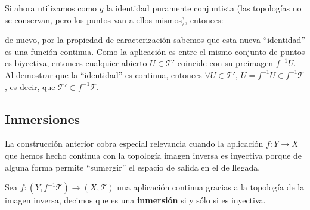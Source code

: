 \begin{demo}
\begin{itemize}
   Si ahora utilizamos como $g$ la identidad puramente conjuntista (las topologías no se conservan, pero los puntos van a ellos mismos), entonces:
    \begin{figure}[H]
        \centering    
    \end{figure}
    de nuevo, por la propiedad de caracterización sabemos que esta nueva ``identidad'' es una función continua. Como la aplicación es entre el mismo conjunto de puntos es biyectiva, entonces cualquier abierto $U\in \mathcal{T}'$ coincide con su preimagen $f^{-1}U$. Al demostrar que la ``identidad'' es continua, entonces $\forall U \in \mathcal{T}', \ U = f^{-1}U\in f^{-1}\mathcal{T}$, es decir, que $\mathcal{T}'\subset f^{-1}\mathcal{T}$.
\end{itemize}
\end{demo}

\subsection{Inmersiones}
\label{sub:inmersiones}
La construcción anterior cobra especial relevancia cuando la aplicación $f: Y \rightarrow X$ que hemos hecho continua con la topología imagen inversa es inyectiva porque de alguna forma permite ``sumergir'' el espacio de salida en el de llegada.

\begin{defi}[Inmersión]
Sea $f:\left( Y, f^{-1}\mathcal{T} \right) \rightarrow \left( X, \mathcal{T} \right)$ una aplicación continua gracias a la topología de la imagen inversa, decimos que es una \textbf{inmersión} si y sólo si es inyectiva.
\end{defi}

